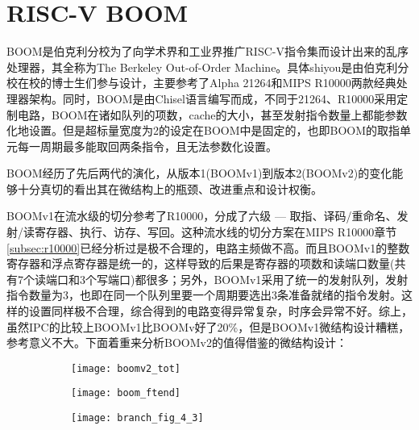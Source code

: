 \section{RISC-V BOOM}\label{subsec:BOOM}

BOOM是伯克利分校为了向学术界和工业界推广RISC-V指令集而设计出来的乱序处理器，其全称为The Berkeley Out-of-Order Machine。具体shiyou是由伯克利分校在校的博士生们参与设计，主要参考了Alpha 21264和MIPS R10000两款经典处理器架构。同时，BOOM是由Chisel语言编写而成，不同于21264、R10000采用定制电路，BOOM在诸如队列的项数，cache的大小，甚至发射指令数量上都能参数化地设置。但是超标量宽度为2的设定在BOOM中是固定的，也即BOOM的取指单元每一周期最多能取回两条指令，且无法参数化设置。

BOOM经历了先后两代的演化，从版本1(BOOMv1)到版本2(BOOMv2)的变化能够十分真切的看出其在微结构上的瓶颈、改进重点和设计权衡。

BOOMv1在流水级的切分参考了R10000，分成了六级 --- 取指、译码/重命名、发射/读寄存器、执行、访存、写回\citep{Celio:EECS-2017-157}。这种流水线的切分方案在MIPS R10000章节\ref{subsec:r10000}已经分析过是极不合理的，电路主频做不高。而且BOOMv1的整数寄存器和浮点寄存器是统一的，这样导致的后果是寄存器的项数和读端口数量(共有7个读端口和3个写端口)都很多；另外，BOOMv1采用了统一的发射队列，发射指令数量为3，也即在同一个队列里要一个周期要选出3条准备就绪的指令发射\citep{Celio:EECS-2017-157}。这样的设置同样极不合理，综合得到的电路变得异常复杂，时序会异常不好。综上，虽然IPC的比较上BOOMv1比BOOMv好了20\%\citep{Celio:EECS-2017-157}，但是BOOMv1微结构设计糟糕，参考意义不大。下面着重来分析BOOMv2的值得借鉴的微结构设计：
\begin{figure}[!htbp]
\centering
	\begin{subfigure}[b]{.45\textwidth}
		\texttt{[image: boomv2\_tot]}
		\caption{}
		\label{fig:boom_total}
	\end{subfigure}\qquad
	\begin{subfigure}[b]{.45\textwidth}
		\texttt{[image: boom\_ftend]}
		\caption{}
		\label{fig:boom_ftend}
		
		\vspace{2ex}
		
		\texttt{[image: branch\_fig\_4\_3]}
		\caption{}
		\label{fig:boom_predictor}
	\end{subfigure}
	\label{fig:boomv2}
\end{figure}

